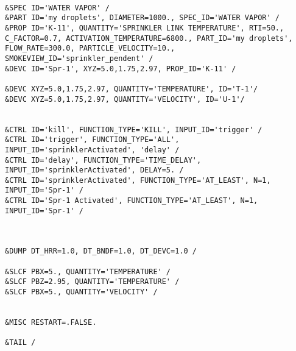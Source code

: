 \begin{lstlisting}[emptylines=0,basicstyle=\tiny]
 
&SPEC ID='WATER VAPOR' /
&PART ID='my droplets', DIAMETER=1000., SPEC_ID='WATER VAPOR' /
&PROP ID='K-11', QUANTITY='SPRINKLER LINK TEMPERATURE', RTI=50., C_FACTOR=0.7, ACTIVATION_TEMPERATURE=6800., PART_ID='my droplets', FLOW_RATE=300.0, PARTICLE_VELOCITY=10., SMOKEVIEW_ID='sprinkler_pendent' /
&DEVC ID='Spr-1', XYZ=5.0,1.75,2.97, PROP_ID='K-11' /

&DEVC XYZ=5.0,1.75,2.97, QUANTITY='TEMPERATURE', ID='T-1'/
&DEVC XYZ=5.0,1.75,2.97, QUANTITY='VELOCITY', ID='U-1'/


&CTRL ID='kill', FUNCTION_TYPE='KILL', INPUT_ID='trigger' /
&CTRL ID='trigger', FUNCTION_TYPE='ALL', INPUT_ID='sprinklerActivated', 'delay' /
&CTRL ID='delay', FUNCTION_TYPE='TIME_DELAY', INPUT_ID='sprinklerActivated', DELAY=5. /
&CTRL ID='sprinklerActivated', FUNCTION_TYPE='AT_LEAST', N=1, INPUT_ID='Spr-1' /
&CTRL ID='Spr-1 Activated', FUNCTION_TYPE='AT_LEAST', N=1, INPUT_ID='Spr-1' /



&DUMP DT_HRR=1.0, DT_BNDF=1.0, DT_DEVC=1.0 /

&SLCF PBX=5., QUANTITY='TEMPERATURE' /
&SLCF PBZ=2.95, QUANTITY='TEMPERATURE' /
&SLCF PBX=5., QUANTITY='VELOCITY' /


&MISC RESTART=.FALSE.

&TAIL /


\end{lstlisting}

